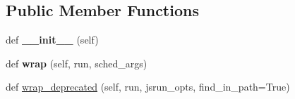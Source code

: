 \subsection*{Public Member Functions}
\begin{DoxyCompactItemize}
\item 
\mbox{\label{classcodar_1_1savanna_1_1runners_1_1_summit_runner_ae02c57d99333e7987709dacee9bc1496}} 
def {\bfseries \+\_\+\+\_\+init\+\_\+\+\_\+} (self)
\item 
\mbox{\label{classcodar_1_1savanna_1_1runners_1_1_summit_runner_ad754a3642a7d7e3dfcac4e6956ec9cbc}} 
def {\bfseries wrap} (self, run, sched\+\_\+args)
\item 
def \hyperlink{classcodar_1_1savanna_1_1runners_1_1_summit_runner_a79042d5ab820ce5cc55292e2c3338994}{wrap\+\_\+deprecated} (self, run, jsrun\+\_\+opts, find\+\_\+in\+\_\+path=True)
\end{DoxyCompactItemize}
